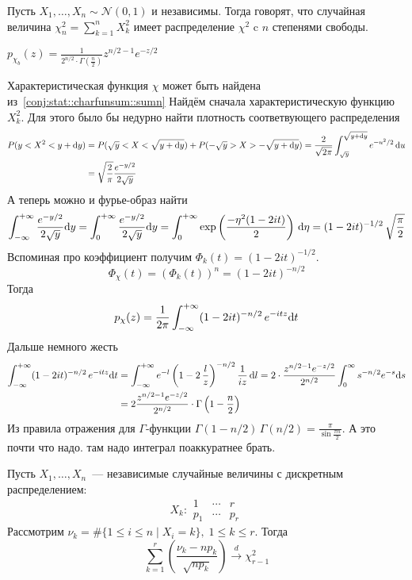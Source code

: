 \documentclass[12pt,timbord]{../../../notes}
\begin{document}
\begin{defn}\label{defn:stat::genmuavr::chi}
  Пусть $X_1, \dotsc, X_n \sim \mathcal N (0,1)$ и независимы. Тогда говорят, что случайная
  величина $\displaystyle \chi_n^2 = \sum_{k=1}^n X_k^2$ имеет распределение $\chi^2$ c $n$
  степенями свободы.
\end{defn}
\begin{prop}\label{prop:stat::genmuavr::chi}
  $\displaystyle p_{\chi_b}(z) = \frac{1}{2^{n/2}\cdot \Gamma (\frac{n}{2} )} z^{n/2 -1} e^{-z/2} $
\end{prop}
\begin{itlproof}
  Характеристическая функция $\chi$ может быть найдена из~\ref{conj:stat::charfunsum::sumn}
  Найдём сначала характеристическую функцию $X_k^2$. Для этого было бы недурно найти плотность
  соответвующего распределения
  \[
    \begin{split}
      P(y < X^2 < y+ \mathrm{d} y) &= P(\sqrt y < X < \sqrt{y + \mathrm{d} y})+ P(-\sqrt y>X >-\sqrt{y+\mathrm{d} y}) 
      = \frac{2}{\sqrt{2\pi}}  \int_{\sqrt y}^{\sqrt{y+\mathrm{d} y}} e^{-u^2/2} \, \mathrm{d} u \\
      &= \sqrt{\frac{2}{\pi} } \frac{e^{-y/2}}{2\sqrt y} 
    \end{split}
  \]
  А теперь можно и фурье-образ найти
  \[
    \int_{-\infty}^{+\infty}\frac{e^{-y/2}}{2\sqrt y}\mathrm{d} y = \int_{0}^{+\infty}\frac{e^{-y/2}}{2\sqrt y}\mathrm{d} y
    = \int_{0}^{+\infty} \exp\left(\frac{-\eta^2(1-2it)}{2}\right)\,\mathrm{d}\eta
    = (1-2it)^{-1/2} \, \sqrt{\frac\pi 2}
  \]
  Вспоминая про коэффициент получим $\Phi_k(t) = (1-2it)^{-1/2}$.
  \[
    \Phi_\chi(t) = \left(\Phi_k(t)\right)^n =  (1-2it)^{-n/2}
  \]
  Тогда \[
    p_\chi(z) = \frac{1}{2\pi} \int_{-\infty}^{+\infty} (1-2it)^{-n/2}\, e^{-itz}\mathrm{d} t
  \]
  Дальше немного жесть
  \begin{align*}
    \int_{-\infty}^{+\infty} (1-2it)^{-n/2}\, e^{-itz}\mathrm{d} t &= \int_{-\infty}^{+\infty} e^{-l} \left(1-2\, \frac{l}{z} \right)^{-n/2}
    \frac{1}{iz} \, \mathrm{d} l 
    = 2\cdot\frac{z^{n/2-1} e^{-z/2}}{2^{n/2}} \int_{0}^{\infty} s^{-n/2} e^{-s} \mathrm{d} s \\
    &= 2\frac{z^{n/2-1} e^{-z/2}}{2^{n/2}} \cdot \Gamma\left(1-\frac{n}{2} \right)
  \end{align*}
  Из правила отражения для $\Gamma$-функции 
  $\Gamma(1-n/2)\, \Gamma(n/2) = \frac{\pi}{\sin\frac{\pi n}{2} } $. А это почти что надо.
  \underdev
  там надо интеграл поаккуратнее брать.
\end{itlproof}

\begin{thrm}\label{thrm:stat::genmuavr}
  Пусть $X_1, \dotsc, X_n$~--- независимые случайные величины с дискретным распределением:
  \[
    X_k \colon
    \begin{array}{c|c|c}
      1 & \cdots & r \\ \hline
      p_1 & \cdots & p_r
    \end{array}
  \]
  Рассмотрим $\nu_k = \# \{ 1 \leqslant i \leqslant n \mid X_i =k\},\; 1\leqslant k \leqslant r$.
  Тогда 
  \[
    \sum_{k=1}^r \left( \frac{\nu_k - n p_k}{\sqrt{n p_k}}  \right) \xrightarrow{d} \chi_{r-1}^2
  \]
\end{thrm}
\end{document}
